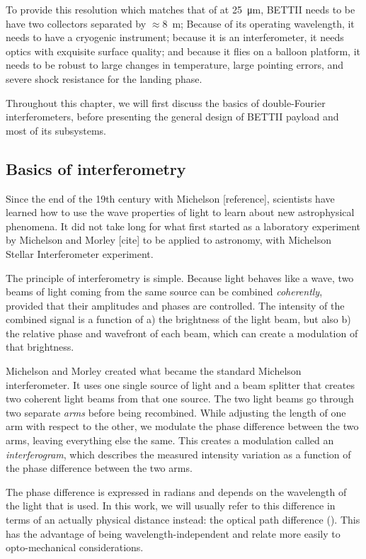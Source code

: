 To provide this resolution which matches that of \JWST  at \SI{25}{\micro\meter}, BETTII needs to be have two collectors separated by $\approx$\SI{8}{\meter}; Because of its operating wavelength, it needs to have a cryogenic instrument; because it is an interferometer, it needs optics with exquisite surface quality; and because it flies on a balloon platform, it needs to be robust to large changes in temperature, large pointing errors, and severe shock resistance for the landing phase.

Throughout this chapter, we will first discuss the basics of double-Fourier interferometers, before presenting the general design of BETTII payload and most of its subsystems.


\subsection{Basics of interferometry}

Since the end of the 19th century with Michelson [reference], scientists have learned how to use the wave properties of light to learn about new astrophysical phenomena. It did not take long for what first started as a laboratory experiment by Michelson and Morley [cite] to be applied to astronomy, with Michelson Stellar Interferometer experiment. 

The principle of interferometry is simple. Because light behaves like a wave, two beams of light coming from the same source can be combined \textit{coherently}, provided that their amplitudes and phases are controlled. The intensity of the combined signal is a function of a) the brightness of the light beam, but also b) the relative phase and wavefront of each beam, which can create a modulation of that brightness.

Michelson and Morley created what became the standard Michelson interferometer. It uses one single source of light and a beam splitter that creates two coherent light beams from that one source. The two light beams go through two separate \textit{arms} before being recombined. While adjusting the length of one arm with respect to the other, we modulate the phase difference between the two arms, leaving everything else the same. This creates a modulation called an \textit{interferogram}, which describes the measured intensity variation as a function of the phase difference between the two arms.

The phase difference is expressed in radians and depends on the wavelength of the light that is used. In this work, we will usually refer to this difference in terms of an actually physical distance instead: the optical path difference (\OPD). This has the advantage of being wavelength-independent and relate more easily to opto-mechanical considerations.

